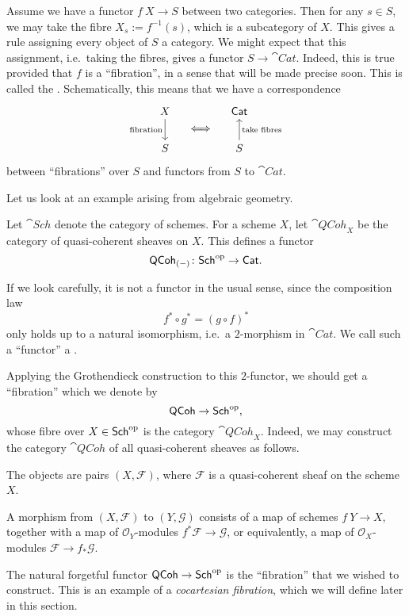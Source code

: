 Assume we have a functor $f\:X\to S$ between two categories.
Then for any $s\in S$, we may take the fibre $X_s:=f^{-1}(s)$,
which is a subcategory of $X$.
This gives a rule assigning every object of $S$ a category.
We might expect that this assignment, i.e.\ taking the fibres,
gives a functor $S\to\cat{Cat}$.
Indeed, this is true provided that $f$ is a ``fibration'',
in a sense that will be made precise soon.
This is called the .
Schematically, this means that we have a correspondence
\[\begin{tikzcd}[row sep=1ex,column sep=1em]
    X\ar[dd,"\text{fibration}"'] && \cat{Cat} \\
    & \Longleftrightarrow \\
    S && S\ar[uu,"\text{take fibres}"']
\end{tikzcd}\]
between ``fibrations'' over $S$ and functors from $S$ to $\cat{Cat}$.

Let us look at an example arising from algebraic geometry.

\begin{example}\label{eg-5-q}
    Let $\cat{Sch}$ denote the category of schemes.
    For a scheme $X$, let $\cat{QCoh}_X$ be the category 
    of quasi-coherent sheaves on $X$.
    This defines a functor 
    \[ \mathsf{QCoh}_{(-)}\colon\mathsf{Sch}^{\mathrm{op}}\to\mathsf{Cat}. \]

    If we look carefully, it is not a functor in the usual sense,
    since the composition law 
    \[ f^*\circ g^*=(g\circ f)^* \]
    only holds up to a natural isomorphism, i.e.\ a $2$-morphism in $\cat{Cat}$.
    We call such a ``functor'' a .

    Applying the Grothendieck construction to this $2$-functor,
    we should get a ``fibration'' which we denote by
    \[ \mathsf{QCoh}\to\mathsf{Sch}^{\mathrm{op}}, \]
    whose fibre over $X\in\mathsf{Sch}^{\mathrm{op}}$ is the category $\cat{QCoh}_X$.
    Indeed, we may construct the category $\cat{QCoh}$ of all quasi-coherent sheaves as follows.
    \begin{itms}
        \item The objects are pairs $(X,\mathscr F)$,
        where $\mathscr F$ is a quasi-coherent sheaf on the scheme $X$.
        \item A morphism from $(X,\mathscr F)$ to $(Y,\mathscr G)$
        consists of a map of schemes $f\:Y\to X$, together with
        a map of $\mathscr O_Y$-modules $f^*\mathscr F\to\mathscr G$, or equivalently,
        a map of $\mathscr O_X$-modules $\mathscr F\to f_*\mathscr G$.
    \end{itms}
    The natural forgetful functor $\mathsf{QCoh}\to\mathsf{Sch}^{\mathrm{op}}$
    is the ``fibration'' that we wished to construct.
    This is an example of a \emph{cocartesian fibration},
    which we will define later in this section. \varqed
\end{example}

